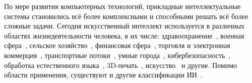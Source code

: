 По мере развития компьютерных технологий, прикладные интеллектуальные системы становились всё более комплексными и способными решать всё более сложные задачи. Сегодня искусственный интеллект используется в различных областях жизнедеятельности человека, в их числе: здравоохранение~\cite{glicksberg, awasthi, kitsios, elyan}, военная сфера~\cite{morgan, elmokadem}, сельское хозяйство~\cite{oliveira, bhagat, padhiary, wang}, финансовая сфера~\cite{bahoo, weber, shiyyab, shabsigh}, торговля и электронная коммерция~\cite{bawack, goti, ziakis}, транспортные потоки~\cite{sayed, jiang, mushtaq, loce}, умные города~\cite{wolniak, podda, zamponi, fekriershad}, кибербезопасность~\cite{malatji, ramanpreet, polito}, обработка естественного языка~\cite{zubiaga, khurana, alqahtani}, 3D-печать~\cite{kong, senthilnathan, petsiuk, paraskevoudis}, искусство~\cite{zhou, oksanen, watiktinnakorn} и другие. Помимо области применения, существуют и другие классификации ИИ~\cite{russell}.
